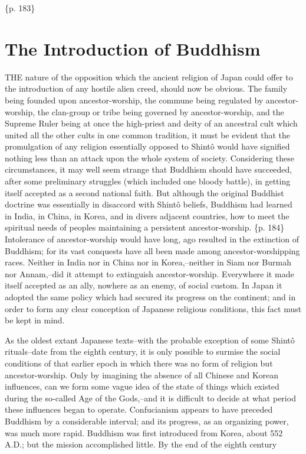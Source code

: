 \{p. 183\}

\section{The Introduction of Buddhism}
\label{sec:orgb2e09fa}

THE nature of the opposition which the ancient religion of Japan could offer to the introduction of any hostile alien creed, should now be obvious. The family being founded upon ancestor-worship, the commune being regulated by ancestor-worship, the clan-group or tribe being governed by ancestor-worship, and the Supreme Ruler being at once the high-priest and deity of an ancestral cult which united all the other cults in one common tradition, it must be evident that the promulgation of any religion essentially opposed to Shintô would have signified nothing less than an attack upon the whole system of society. Considering these circumstances, it may well seem strange that Buddhism should have succeeded, after some preliminary struggles (which included one bloody battle), in getting itself accepted as a second national faith. But although the original Buddhist doctrine was essentially in disaccord with Shintô beliefs, Buddhism had learned in India, in China, in Korea, and in divers adjacent countries, how to meet the spiritual needs of peoples maintaining a persistent ancestor-worship. \{p. 184\} Intolerance of ancestor-worship would have long, ago resulted in the extinction of Buddhism; for its vast conquests have all been made among ancestor-worshipping races. Neither in India nor in China nor in Korea,--neither in Siam nor Burmah nor Annam,--did it attempt to extinguish ancestor-worship. Everywhere it made itself accepted as an ally, nowhere as an enemy, of social custom. In Japan it adopted the same policy which had secured its progress on the continent; and in order to form any clear conception of Japanese religious conditions, this fact must be kept in mind.

As the oldest extant Japanese texts--with the probable exception of some Shintô rituals--date from the eighth century, it is only possible to surmise the social conditions of that earlier epoch in which there was no form of religion but ancestor-worship. Only by imagining the absence of all Chinese and Korean influences, can we form some vague idea of the state of things which existed during the so-called Age of the Gods,--and it is difficult to decide at what period these influences began to operate. Confucianism appears to have preceded Buddhism by a considerable interval; and its progress, as an organizing power, was much more rapid. Buddhism was first introduced from Korea, about 552 A.D.; but the mission accomplished little. By the end of the eighth century


